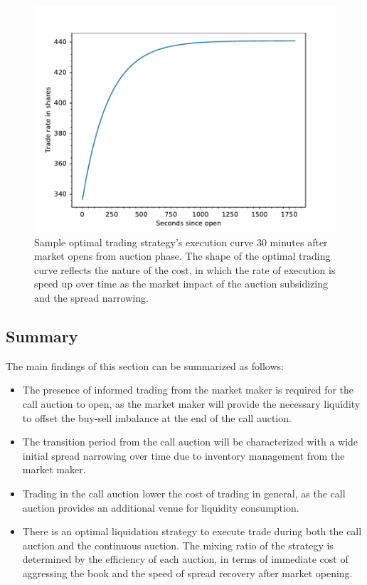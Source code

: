 \documentclass{article}
\begin{document}


\begin{figure}[h]
  \includegraphics[width=\textwidth]{images/SampleTradeCurve}
  \caption{Sample optimal trading strategy's execution curve 30 minutes after market opens from auction phase. The shape of the optimal trading curve reflects the nature of the cost, in which the rate of execution is speed up over time as the market impact of the auction subsidizing and the spread narrowing.}
  \label{fig:optimal_curve_strategy}
\end{figure}

\subsection{Summary}

The main findings of this section can be summarized as follows:

\begin{itemize}
  \item The presence of informed trading from the market maker is required for the call auction to open, as the market maker will provide the necessary liquidity to offset the buy-sell imbalance at the end of the call auction.
  \item The transition period from the call auction will be characterized with a wide initial spread narrowing over time due to inventory management from the market maker.
  \item Trading in the call auction lower the cost of trading in general, as the call auction provides an additional venue for liquidity consumption.
  \item There is an optimal liquidation strategy to execute trade during both the call auction and the continuous auction. The mixing ratio of the strategy is determined by the efficiency of each auction, in terms of immediate cost of aggressing the book and the speed of spread recovery after market opening.
\end{itemize}
\end{document}
